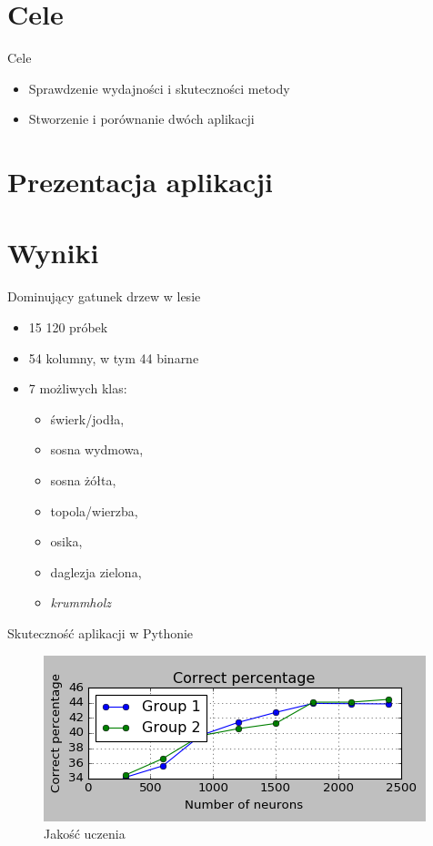 \documentclass{beamer}
\begin{document}
\section{Cele}
\begin{frame}{Cele}
\begin{itemize}
\item Sprawdzenie wydajności i skuteczności metody
\item Stworzenie i porównanie dwóch aplikacji
\end{itemize}
\end{frame}
\section{Prezentacja aplikacji}

\section{Wyniki}
\begin{frame}{Dominujący gatunek drzew w lesie}
\begin{itemize}
\item 15 120 próbek
\item 54 kolumny, w tym 44 binarne
\item 7 możliwych klas:
\begin{itemize}
\item świerk/jodła,
\item sosna wydmowa,
\item sosna żółta,
\item topola/wierzba,
\item osika,
\item daglezja zielona,
\item \textit{krummholz}
\end{itemize}
\end{itemize}
\end{frame}

\begin{frame}{Skuteczność aplikacji w Pythonie}
\begin{figure}[H]
\includegraphics[width=\textwidth]{wyniki_forest_python_percentage.png}
\caption{Jakość uczenia}
\end{figure}
\end{frame}
\end{document}
